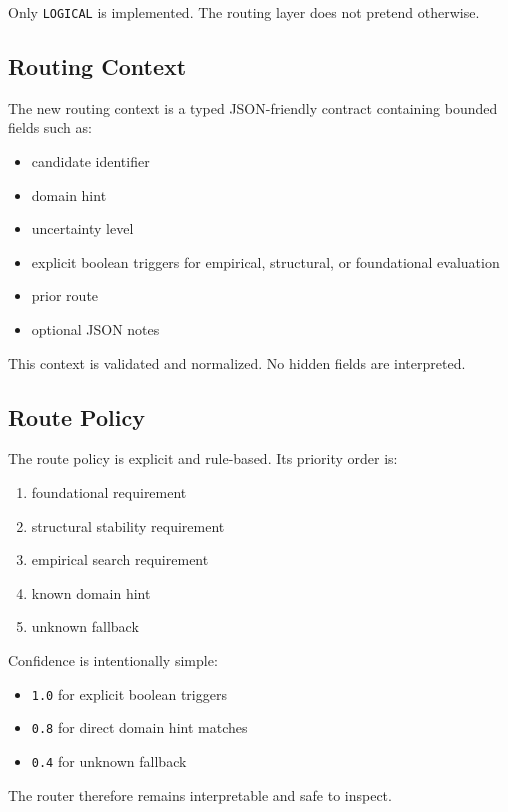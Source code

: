 \documentclass[11pt]{article}
\begin{document}
Only \texttt{LOGICAL} is implemented.
The routing layer does not pretend otherwise.

\subsection{Routing Context}

The new routing context is a typed JSON-friendly contract containing bounded fields such as:

\begin{itemize}
\item candidate identifier
\item domain hint
\item uncertainty level
\item explicit boolean triggers for empirical, structural, or foundational evaluation
\item prior route
\item optional JSON notes
\end{itemize}

This context is validated and normalized.
No hidden fields are interpreted.

\subsection{Route Policy}

The route policy is explicit and rule-based.
Its priority order is:

\begin{enumerate}
\item foundational requirement
\item structural stability requirement
\item empirical search requirement
\item known domain hint
\item unknown fallback
\end{enumerate}

Confidence is intentionally simple:

\begin{itemize}
\item \texttt{1.0} for explicit boolean triggers
\item \texttt{0.8} for direct domain hint matches
\item \texttt{0.4} for unknown fallback
\end{itemize}

The router therefore remains interpretable and safe to inspect.
\end{document}
